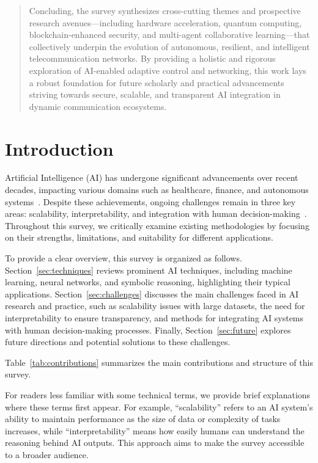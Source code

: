 \documentclass[sigconf]{acmart}
\begin{document}
\begin{abstract}
Concluding, the survey synthesizes cross-cutting themes and prospective research avenues—including hardware acceleration, quantum computing, blockchain-enhanced security, and multi-agent collaborative learning—that collectively underpin the evolution of autonomous, resilient, and intelligent telecommunication networks. By providing a holistic and rigorous exploration of AI-enabled adaptive control and networking, this work lays a robust foundation for future scholarly and practical advancements striving towards secure, scalable, and transparent AI integration in dynamic communication ecosystems.
\end{abstract}

\maketitle

\section{Introduction}

Artificial Intelligence (AI) has undergone significant advancements over recent decades, impacting various domains such as healthcare, finance, and autonomous systems~\cite{smith2020advances}. Despite these achievements, ongoing challenges remain in three key areas: scalability, interpretability, and integration with human decision-making~\cite{johnson2019challenges}. Throughout this survey, we critically examine existing methodologies by focusing on their strengths, limitations, and suitability for different applications.

To provide a clear overview, this survey is organized as follows. Section~\ref{sec:techniques} reviews prominent AI techniques, including machine learning, neural networks, and symbolic reasoning, highlighting their typical applications. Section~\ref{sec:challenges} discusses the main challenges faced in AI research and practice, such as scalability issues with large datasets, the need for interpretability to ensure transparency, and methods for integrating AI systems with human decision-making processes. Finally, Section~\ref{sec:future} explores future directions and potential solutions to these challenges.

Table~\ref{tab:contributions} summarizes the main contributions and structure of this survey.

For readers less familiar with some technical terms, we provide brief explanations where these terms first appear. For example, “scalability” refers to an AI system's ability to maintain performance as the size of data or complexity of tasks increases, while “interpretability” means how easily humans can understand the reasoning behind AI outputs. This approach aims to make the survey accessible to a broader audience.
\end{document}

